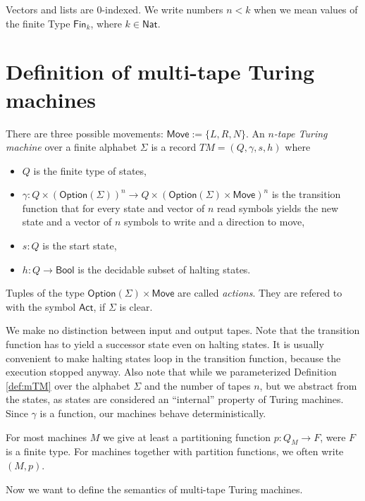 \documentclass{psartcl}
\newcommand{\MS}[1]{\textsf{#1}}
\newcommand{\setOf}[1]{\bigl \{ #1 \bigr \}}
\newcommand{\from}{:}
\renewcommand{\to}{\rightarrow}
\newcommand{\Option}{\MS{Option}}
\newcommand{\Fin}{\MS{Fin}}
\newcommand{\Bool}{\MS{Bool}}
\newcommand{\Nat}{\MS{Nat}}
\newcommand{\Move}{\MS{Move}}
\begin{document}
Vectors and lists are $0$-indexed.  We write numbers $n < k$ when we mean values of the finite Type $\Fin_k$, where $k\in\Nat$.

\section{Definition of multi-tape Turing machines}
\label{sec:def}

\begin{definition}
  \label{def:mTM}
  There are three possible movements:  $\MS{Move} := \setOf{L, R, N}$.
  An \emph{$n$-tape Turing machine} over a finite alphabet $\Sigma$ is a record $TM = (Q, \gamma, s, h)$ where
  \begin{itemize}
    \item $Q$ is the finite type of states,
    \item $\gamma \from Q \times (\Option(\Sigma))^n \to Q \times (\Option(\Sigma) \times \MS{Move})^n$ is the transition function that for every state and
      vector of $n$ read symbols yields the new state and a vector of $n$ symbols to write and a direction to move,
    \item $s:Q$ is the start state,
    \item $h \from Q \to \Bool$ is the decidable subset of halting states.
  \end{itemize}

  Tuples of the type $\Option(\Sigma) \times \Move$ are called \emph{actions}.  They are refered to with the symbol $\MS{Act}$, if $\Sigma$ is clear.
\end{definition}

We make no distinction between input and output tapes.  Note that the transition function has to yield a successor state even on halting states.  It
is usually convenient to make halting states loop in the transition function, because the execution stopped anyway.  Also note that while we
parameterized Definition \ref{def:mTM} over the alphabet $\Sigma$ and the number of tapes $n$, but we abstract from the states, as states are
considered an ``internal'' property of Turing machines.  Since $\gamma$ is a function, our machines behave deterministically.

For most machines $M$ we give at least a partitioning function $p \from Q_M \to F$, were $F$ is a finite type.
For machines together with partition functions, we often write $(M, p)$.

Now we want to define the semantics of multi-tape Turing machines.
\end{document}
